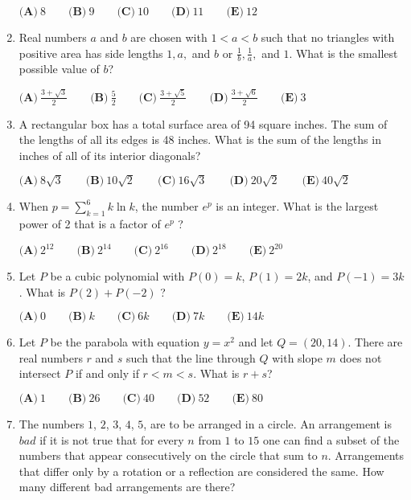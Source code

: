 \documentclass{article}
\begin{document}
\begin{enumerate}[label=\arabic*., itemsep=0.5em]
\( \textbf{(A)}\ 8\qquad\textbf{(B)}\ 9\qquad\textbf{(C)}\ 10\qquad\textbf{(D)}\ 11\qquad\textbf{(E)}\ 12 \)\par \vspace{0.5em}\item Real numbers \(a\) and \(b\) are chosen with \(1<a<b\) such that no triangles with positive area has side lengths \(1, a,\) and \(b\) or \(\tfrac{1}{b}, \tfrac{1}{a},\) and \(1\). What is the smallest possible value of \(b\)?

\( \textbf{(A)}\ \frac{3+\sqrt{3}}{2}\qquad\textbf{(B)}\ \frac{5}{2}\qquad\textbf{(C)}\ \frac{3+\sqrt{5}}{2}\qquad\textbf{(D)}\ \frac{3+\sqrt{6}}{2}\qquad\textbf{(E)}\ 3 \)\par \vspace{0.5em}\item A rectangular box has a total surface area of 94 square inches. The sum of the lengths of all its edges is 48 inches. What is the sum of the lengths in inches of all of its interior diagonals?

\( \textbf{(A)}\ 8\sqrt{3}\qquad\textbf{(B)}\ 10\sqrt{2}\qquad\textbf{(C)}\ 16\sqrt{3}\qquad\textbf{(D)}\ 20\sqrt{2}\qquad\textbf{(E)}\ 40\sqrt{2} \)\par \vspace{0.5em}\item When \(p = \sum\limits_{k=1}^{6} k \ln{k}\), the number \(e^p\) is an integer.  What is the largest power of 2 that is a factor of \(e^p\) ?

\( \textbf{(A)}\ 2^{12}\qquad\textbf{(B)}\ 2^{14}\qquad\textbf{(C)}\ 2^{16}\qquad\textbf{(D)}\ 2^{18}\qquad\textbf{(E)}\ 2^{20} \)\par \vspace{0.5em}\item Let \(P\) be a cubic polynomial with \(P(0) = k\), \(P(1) = 2k\), and \(P(-1) = 3k\).  What is \(P(2) + P(-2)\) ?

\( \textbf{(A)}\ 0\qquad\textbf{(B)}\ k\qquad\textbf{(C)}\ 6k\qquad\textbf{(D)}\ 7k\qquad\textbf{(E)}\ 14k \)\par \vspace{0.5em}\item Let \(P\) be the parabola with equation \(y=x^2\) and let \(Q = (20, 14)\). There are real numbers \(r\) and \(s\) such that the line through \(Q\) with slope \(m\) does not intersect \(P\) if and only if \(r < m < s\). What is \(r + s\)?

\( \textbf{(A)}\ 1\qquad\textbf{(B)}\ 26\qquad\textbf{(C)}\ 40\qquad\textbf{(D)}\ 52\qquad\textbf{(E)}\ 80 \)\par \vspace{0.5em}\item The numbers \(1\), \(2\), \(3\), \(4\), \(5\), are to be arranged in a circle.  An arrangement is \(\textit{bad}\) if it is not true that for every \(n\) from \(1\) to \(15\) one can find a subset of the numbers that appear consecutively on the circle that sum to \(n\).  Arrangements that differ only by a rotation or a reflection are considered the same.  How many different bad arrangements are there?


\end{enumerate}
\end{document}
